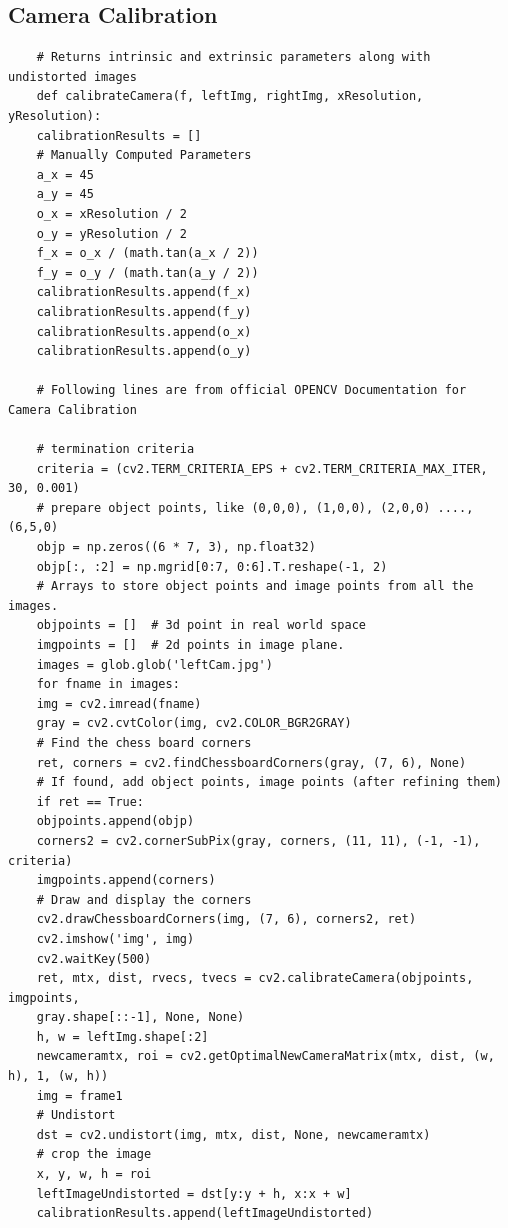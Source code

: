 \documentclass[11pt]{scrartcl}
\begin{document}
\subsection{Camera Calibration}
\begin{verbatim}
	# Returns intrinsic and extrinsic parameters along with undistorted images
	def calibrateCamera(f, leftImg, rightImg, xResolution, yResolution):
	calibrationResults = []
	# Manually Computed Parameters
	a_x = 45
	a_y = 45
	o_x = xResolution / 2
	o_y = yResolution / 2
	f_x = o_x / (math.tan(a_x / 2))
	f_y = o_y / (math.tan(a_y / 2))
	calibrationResults.append(f_x)
	calibrationResults.append(f_y)
	calibrationResults.append(o_x)
	calibrationResults.append(o_y)
	
	# Following lines are from official OPENCV Documentation for Camera Calibration
	
	# termination criteria
	criteria = (cv2.TERM_CRITERIA_EPS + cv2.TERM_CRITERIA_MAX_ITER, 30, 0.001)
	# prepare object points, like (0,0,0), (1,0,0), (2,0,0) ....,(6,5,0)
	objp = np.zeros((6 * 7, 3), np.float32)
	objp[:, :2] = np.mgrid[0:7, 0:6].T.reshape(-1, 2)
	# Arrays to store object points and image points from all the images.
	objpoints = []  # 3d point in real world space
	imgpoints = []  # 2d points in image plane.
	images = glob.glob('leftCam.jpg')
	for fname in images:
	img = cv2.imread(fname)
	gray = cv2.cvtColor(img, cv2.COLOR_BGR2GRAY)
	# Find the chess board corners
	ret, corners = cv2.findChessboardCorners(gray, (7, 6), None)
	# If found, add object points, image points (after refining them)
	if ret == True:
	objpoints.append(objp)
	corners2 = cv2.cornerSubPix(gray, corners, (11, 11), (-1, -1), criteria)
	imgpoints.append(corners)
	# Draw and display the corners
	cv2.drawChessboardCorners(img, (7, 6), corners2, ret)
	cv2.imshow('img', img)
	cv2.waitKey(500)
	ret, mtx, dist, rvecs, tvecs = cv2.calibrateCamera(objpoints, imgpoints, 
	gray.shape[::-1], None, None)
	h, w = leftImg.shape[:2]
	newcameramtx, roi = cv2.getOptimalNewCameraMatrix(mtx, dist, (w, h), 1, (w, h))
	img = frame1
	# Undistort
	dst = cv2.undistort(img, mtx, dist, None, newcameramtx)
	# crop the image
	x, y, w, h = roi
	leftImageUndistorted = dst[y:y + h, x:x + w]
	calibrationResults.append(leftImageUndistorted)
	

\end{verbatim}
\end{document}
